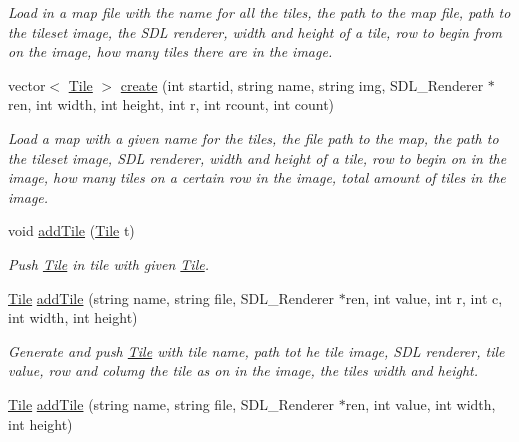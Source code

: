 \begin{DoxyCompactItemize}
\begin{DoxyCompactList}\small\item\em Load in a map file with the name for all the tiles, the path to the map file, path to the tileset image, the S\+DL renderer, width and height of a tile, row to begin from on the image, how many tiles there are in the image. \end{DoxyCompactList}\item 
vector$<$ \hyperlink{classTile}{Tile} $>$ \hyperlink{classTileset_a7671c66fd7dfd4cf62524a5d518afbe6}{create} (int startid, string name, string img, S\+D\+L\+\_\+\+Renderer $\ast$ren, int width, int height, int r, int rcount, int count)\hypertarget{classTileset_a7671c66fd7dfd4cf62524a5d518afbe6}{}\label{classTileset_a7671c66fd7dfd4cf62524a5d518afbe6}

\begin{DoxyCompactList}\small\item\em Load a map with a given name for the tiles, the file path to the map, the path to the tileset image, S\+DL renderer, width and height of a tile, row to begin on in the image, how many tiles on a certain row in the image, total amount of tiles in the image. \end{DoxyCompactList}\item 
void \hyperlink{classTileset_a26acaabd06601aba2e277fdd2b750fc7}{add\+Tile} (\hyperlink{classTile}{Tile} t)\hypertarget{classTileset_a26acaabd06601aba2e277fdd2b750fc7}{}\label{classTileset_a26acaabd06601aba2e277fdd2b750fc7}

\begin{DoxyCompactList}\small\item\em Push \hyperlink{classTile}{Tile} in tile with given \hyperlink{classTile}{Tile}. \end{DoxyCompactList}\item 
\hyperlink{classTile}{Tile} \hyperlink{classTileset_aea4085286f450afdb53b22c917a77cba}{add\+Tile} (string name, string file, S\+D\+L\+\_\+\+Renderer $\ast$ren, int value, int r, int c, int width, int height)\hypertarget{classTileset_aea4085286f450afdb53b22c917a77cba}{}\label{classTileset_aea4085286f450afdb53b22c917a77cba}

\begin{DoxyCompactList}\small\item\em Generate and push \hyperlink{classTile}{Tile} with tile name, path tot he tile image, S\+DL renderer, tile value, row and columg the tile as on in the image, the tiles width and height. \end{DoxyCompactList}\item 
\hyperlink{classTile}{Tile} \hyperlink{classTileset_af8022d2b4129de86c132172ac8ce23a5}{add\+Tile} (string name, string file, S\+D\+L\+\_\+\+Renderer $\ast$ren, int value, int width, int height)\hypertarget{classTileset_af8022d2b4129de86c132172ac8ce23a5}{}\label{classTileset_af8022d2b4129de86c132172ac8ce23a5}


\end{DoxyCompactItemize}
